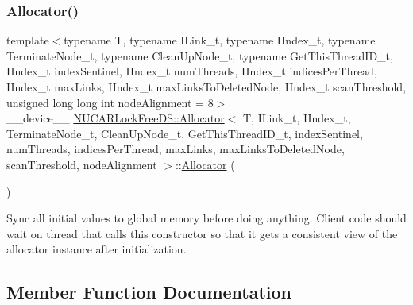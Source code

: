 \subsubsection{\texorpdfstring{Allocator()}{Allocator()}}
{\footnotesize\ttfamily template$<$typename T, typename I\+Link\+\_\+t, typename I\+Index\+\_\+t, typename Terminate\+Node\+\_\+t, typename Clean\+Up\+Node\+\_\+t, typename Get\+This\+Thread\+I\+D\+\_\+t, I\+Index\+\_\+t index\+Sentinel, I\+Index\+\_\+t num\+Threads, I\+Index\+\_\+t indices\+Per\+Thread, I\+Index\+\_\+t max\+Links, I\+Index\+\_\+t max\+Links\+To\+Deleted\+Node, I\+Index\+\_\+t scan\+Threshold, unsigned long long int node\+Alignment = 8$>$ \\
\+\_\+\+\_\+device\+\_\+\+\_\+ \mbox{\hyperlink{class_n_u_c_a_r_lock_free_d_s_1_1_allocator}{N\+U\+C\+A\+R\+Lock\+Free\+D\+S\+::\+Allocator}}$<$ T, I\+Link\+\_\+t, I\+Index\+\_\+t, Terminate\+Node\+\_\+t, Clean\+Up\+Node\+\_\+t, Get\+This\+Thread\+I\+D\+\_\+t, index\+Sentinel, num\+Threads, indices\+Per\+Thread, max\+Links, max\+Links\+To\+Deleted\+Node, scan\+Threshold, node\+Alignment $>$\+::\mbox{\hyperlink{class_n_u_c_a_r_lock_free_d_s_1_1_allocator}{Allocator}} (\begin{DoxyParamCaption}{ }\end{DoxyParamCaption})\hspace{0.3cm}{\ttfamily [inline]}}

Sync all initial values to global memory before doing anything. Client code should wait on thread that calls this constructor so that it gets a consistent view of the allocator instance after initialization. 

\subsection{Member Function Documentation}
\mbox{\label{class_n_u_c_a_r_lock_free_d_s_1_1_allocator_a1d1b9fa15fea39ba361ca1cdc5bfaeb9}} 
